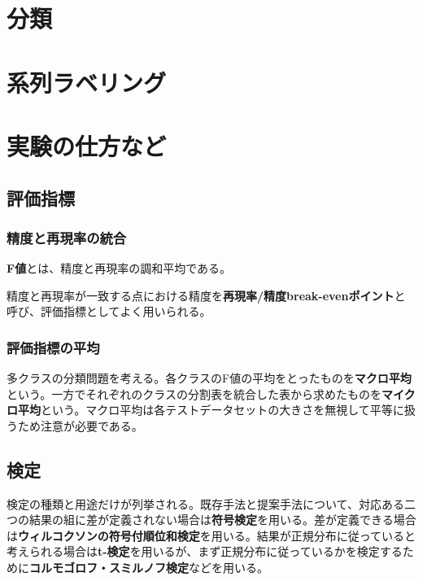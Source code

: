 \documentclass{jsarticle}
\begin{document}
\section{分類}



\section{系列ラベリング}


\section{実験の仕方など}

\setcounter{subsection}{2}
\subsection{評価指標}

\setcounter{subsubsection}{2}
\subsubsection{精度と再現率の統合}

\textbf{F値}とは、精度と再現率の調和平均である。

精度と再現率が一致する点における精度を\textbf{再現率/精度break-evenポイント}と呼び、評価指標としてよく用いられる。

\setcounter{subsubsection}{4}
\subsubsection{評価指標の平均}

多クラスの分類問題を考える。各クラスのF値の平均をとったものを\textbf{マクロ平均}という。一方でそれぞれのクラスの分割表を統合した表から求めたものを\textbf{マイクロ平均}という。マクロ平均は各テストデータセットの大きさを無視して平等に扱うため注意が必要である。

\subsection{検定}

検定の種類と用途だけが列挙される。既存手法と提案手法について、対応ある二つの結果の組に差が定義されない場合は\textbf{符号検定}を用いる。差が定義できる場合は\textbf{ウィルコクソンの符号付順位和検定}を用いる。結果が正規分布に従っていると考えられる場合は\textbf{t-検定}を用いるが、まず正規分布に従っているかを検定するために\textbf{コルモゴロフ・スミルノフ検定}などを用いる。
\end{document}
